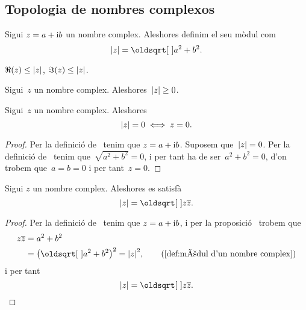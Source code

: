 \documentclass[../Apunts.tex]{subfiles}
\begin{document}
	\subsection{Topologia de nombres complexos}
	\begin{definition}
		\label{def:mòdul d'un nombre complex}
		Sigui \(z=a+\mathrm{i} b\) un nombre complex. Aleshores definim el seu mòdul com
		\[\modul{z}=\sqrt{a^{2}+b^{2}}.\]
	\end{definition}
	\begin{observation}
		\label{obs:les parts real i imaginàries d'un complex són menors que el seu mòdul}
		\label{obs:la part real d'un complex és menor que el seu mòdul}
		\label{obs:la part imaginària d'un complex és menor que el seu mòdul}
		\(\Re(z)\leq\modul{z}\), \(\Im(z)\leq\modul{z}\).
	\end{observation}
	\begin{observation}
		\label{prop:el mòdul d'un nombre complex és no negatiu}
		Sigui~\(z\) un nombre complex. Aleshores~\(\modul{z}\geq0\).
	\end{observation}
	\begin{proposition}
		\label{prop:el mòdul d'un nombre complex és zero si i només si aquest és zero}
		Sigui~\(z\) un nombre complex. Aleshores
		\[\modul{z}=0\sii z=0.\]
		\begin{proof}
			Per la definició de~ tenim que \(z=a+\mathrm{i} b\). Suposem que~\(\modul{z}=0\). Per la definició de~ tenim que~\(\sqrt{a^{2}+b^{2}}=0\), i per tant ha de ser~\(a^{2}+b^{2}=0\), d'on trobem que~\(a=b=0\) i per tant~\(z=0\).
		\end{proof}
	\end{proposition}
	\begin{proposition}
		\label{prop:el mòdul d'un nombre complex és l'arrel del nombre pel seu conjugat}
		Sigui \(z\) un nombre complex. Aleshores es satisfà
		\[\modul{z}=\sqrt{z\conjugat{z}}.\]
		\begin{proof}
			Per la definició de~ tenim que \(z=a+\mathrm{i} b\), i per la proposició~ trobem que
			\begin{align*}
				z\conjugat{z}&=a^{2}+b^{2} \\
				&=\big(\sqrt{a^{2}+b^{2}}\big)^{2}=\modul{z}^{2}, \tag{\ref{def:mòdul d'un nombre complex}}
			\end{align*}
			i per tant 
			\[\modul{z}=\sqrt{z\conjugat{z}}.\qedhere\]
		\end{proof}
	\end{proposition}
\end{document}
